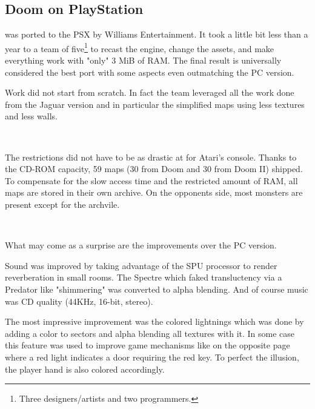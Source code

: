 \subsection{Doom on PlayStation}
\doom was ported to the PSX by Williams Entertainment. It took a little bit less than a year to a team of five\footnote{Three designers/artists and two programmers.} to recast the engine, change the assets, and make everything work with "only" 3 MiB of RAM. The final result is universally considered the best port with some aspects even outmatching the PC version.\\
\par
Work did not start from scratch. In fact the team leveraged all the work done from the Jaguar version and in particular the simplified maps using less textures and less walls.\\
\par
{}\\
\par
  The restrictions did not have to be as drastic at for Atari's console. Thanks to the CD-ROM capacity, 59 maps (30 from Doom and 30 from Doom II) shipped. To compensate for the slow access time and the restricted amount of RAM, all maps are stored in their own  archive. On the opponents side, most monsters are present except for the archvile.\\
\par
{}\\
\par
What may come as a surprise are the improvements over the PC version.\\
\par
Sound was improved by taking advantage of the SPU processor to render reverberation in small rooms. The Spectre which faked transluctency via a Predator like  "shimmering" was converted to alpha blending. And of course music was CD quality (44KHz, 16-bit, stereo).\\
\par
 The most impressive improvement was the colored lightnings which was done by adding a color to sectors and alpha blending all textures with it. In some case this feature was used to improve game mechanisms like on the opposite page where a red light indicates a door requiring the red key. To perfect the illusion, the player hand is also colored accordingly.\\
\par


